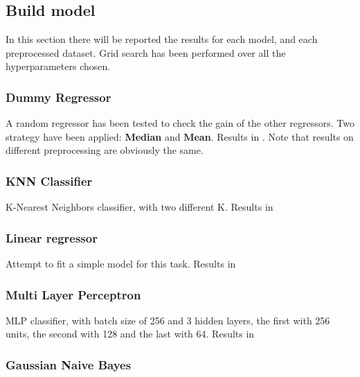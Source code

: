 \subsection{Build model}

In this section there will be reported the results for each model, and each preprocessed dataset.
Grid search has been performed over all the hyperparameters chosen.


\subsubsection{Dummy Regressor}

A random regressor has been tested to check the gain of the other regressors. Two strategy have been applied: \textbf{Median} and \textbf{Mean}. Results in .
Note that results on different preprocessing are obviously the same.



\subsubsection{KNN Classifier}

K-Nearest Neighbors classifier, with two different K. Results in 



\subsubsection{Linear regressor}

Attempt to fit a simple model for this task. Results in 




\subsubsection{Multi Layer Perceptron}

MLP classifier, with batch size of 256 and 3 hidden layers, the first with 256 units, the second with 128 and the last with 64. Results in 



\subsubsection{Gaussian Naive Bayes}

